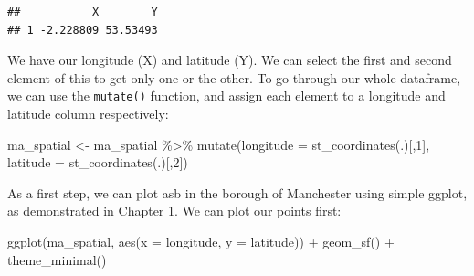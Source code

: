 \documentclass[
]{book}
\makeatletter
\newenvironment{Shaded}{\begin{snugshade}}{\end{snugshade}}
\newcommand{\AttributeTok}[1]{\textcolor[rgb]{0.61,0.61,0.61}{#1}}
\newcommand{\DecValTok}[1]{\textcolor[rgb]{0.06,0.06,0.06}{#1}}
\newcommand{\FunctionTok}[1]{\textcolor[rgb]{0,0,0}{#1}}
\newcommand{\NormalTok}[1]{#1}
\newcommand{\OtherTok}[1]{\textcolor[rgb]{0.37,0.37,0.37}{#1}}
\newcommand{\SpecialCharTok}[1]{\textcolor[rgb]{0,0,0}{#1}}
\newenvironment{kframe}{%
\medskip{}
\setlength{\fboxsep}{.8em}
 \def\at@end@of@kframe{}%
 \ifinner\ifhmode%
  \def\at@end@of@kframe{\end{minipage}}%
  \begin{minipage}{\columnwidth}%
 \fi\fi%
 \def\FrameCommand##1{\hskip\@totalleftmargin \hskip-\fboxsep
 \colorbox{shadecolor}{##1}\hskip-\fboxsep
     \hskip-\linewidth \hskip-\@totalleftmargin \hskip\columnwidth}%
 \MakeFramed {\advance\hsize-\width
   \@totalleftmargin\z@ \linewidth\hsize
   \@setminipage}}%
 {\par\unskip\endMakeFramed%
 \at@end@of@kframe}
\renewenvironment{Shaded}{\begin{kframe}}{\end{kframe}}
\makeatother
\begin{document}
\begin{verbatim}
##           X        Y
## 1 -2.228809 53.53493
\end{verbatim}

We have our longitude (X) and latitude (Y). We can select the first and second element of this to get only one or the other. To go through our whole dataframe, we can use the \texttt{mutate()} function, and assign each element to a longitude and latitude column respectively:

\begin{Shaded}
\begin{Highlighting}[]
\NormalTok{ma\_spatial }\OtherTok{\textless{}{-}}\NormalTok{ ma\_spatial }\SpecialCharTok{\%\textgreater{}\%} 
  \FunctionTok{mutate}\NormalTok{(}\AttributeTok{longitude =} \FunctionTok{st\_coordinates}\NormalTok{(.)[,}\DecValTok{1}\NormalTok{],}
         \AttributeTok{latitude =} \FunctionTok{st\_coordinates}\NormalTok{(.)[,}\DecValTok{2}\NormalTok{])}
\end{Highlighting}
\end{Shaded}

As a first step, we can plot asb in the borough of Manchester using simple ggplot, as demonstrated in Chapter 1. We can plot our points first:

\begin{Shaded}
\begin{Highlighting}[]
\FunctionTok{ggplot}\NormalTok{(ma\_spatial, }\FunctionTok{aes}\NormalTok{(}\AttributeTok{x =}\NormalTok{ longitude, }\AttributeTok{y =}\NormalTok{ latitude)) }\SpecialCharTok{+}
  \FunctionTok{geom\_sf}\NormalTok{() }\SpecialCharTok{+} 
  \FunctionTok{theme\_minimal}\NormalTok{()}
\end{Highlighting}
\end{Shaded}
\end{document}
